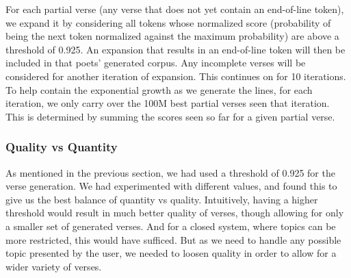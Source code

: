 \documentclass[11pt]{article}
\begin{document}
For each partial verse (any verse that does not yet contain an end-of-line token), we expand it by considering all tokens whose normalized score (probability of being the next token normalized against the maximum probability) are above a threshold of 0.925. 
An expansion that results in an end-of-line token will then be included in that poets' generated corpus.
Any incomplete verses will be considered for another iteration of expansion.
This continues on for 10 iterations.
To help contain the exponential growth as we generate the lines, for each iteration, we only carry over the 100M best partial verses seen that iteration.
This is determined by summing the scores seen so far for a given partial verse.


\subsubsection{Quality vs Quantity}

As mentioned in the previous section, we had used a threshold of 0.925 for the verse generation.
We had experimented with different values, and found this to give us the best balance of quantity vs quality.
Intuitively, having a higher threshold would result in much better quality of verses, though allowing for only a smaller set of generated verses.
And for a closed system, where topics can be more restricted, this would have sufficed.
But as we need to handle any possible topic presented by the user, we needed to loosen quality in order to allow for a wider variety of verses.



\end{document}

